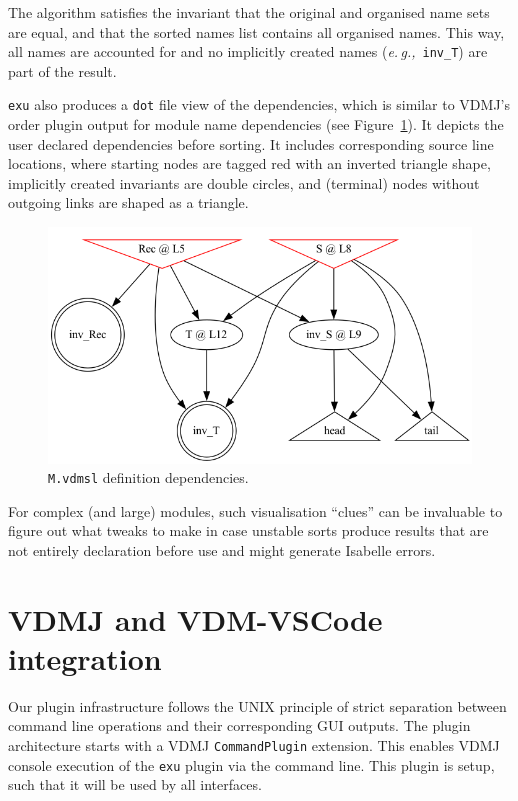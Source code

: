 \documentclass[runningheads,a4paper]{llncs}
\newcommand{\eg}{{\em e.\,g.,\/}}
\begin{document}
The algorithm satisfies the invariant that the original and organised name sets are equal, and that the sorted names list contains all organised names. This way, all names are accounted for and no implicitly created names (\eg~\verb'inv_T') are part of the result.     

\texttt{exu} also produces a \texttt{dot} file view of the dependencies, which is similar to VDMJ's order plugin output for module name dependencies (see Figure~\ref{fig:Mdot}). It depicts the user declared dependencies before sorting. It includes corresponding source line locations, where starting nodes are tagged red with an inverted triangle shape, implicitly created invariants are double circles, and (terminal) nodes without outgoing links are shaped as a triangle.  
%
\begin{figure}[htbp]
    \centering
        \includegraphics[width=\textwidth,scale=0.4]{figures/M.png}
    \caption{\texttt{M.vdmsl} definition dependencies.}\label{fig:Mdot}
 \end{figure}
%
For complex (and large) modules, such visualisation ``clues'' can be invaluable to figure out what tweaks to make in case unstable sorts produce results that are not entirely declaration before use and might generate Isabelle errors. 

\section{VDMJ and VDM-VSCode integration}\label{sec:integration}

Our plugin infrastructure follows the UNIX principle of strict separation between command line operations and their corresponding GUI outputs. The plugin architecture starts with a VDMJ \texttt{CommandPlugin} extension. This enables VDMJ console execution of the \texttt{exu} plugin via the command line. This plugin is setup, such that it will be used by all interfaces. 
\end{document}
